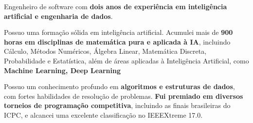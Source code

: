 \documentclass[a4paper,12pt]{article}
\begin{document}



Engenheiro de software com\textbf{ dois anos de experiência em inteligência artificial e engenharia de dados}.

Possuo uma formação sólida em inteligência artificial. Acumulei mais de \textbf{900 horas em disciplinas de matemática pura e aplicada à IA}, incluindo Cálculo, Métodos Numéricos, Álgebra Linear, Matemática Discreta, Probabilidade e Estatística, além de áreas aplicadas à Inteligência Artificial, como \textbf{Machine Learning, Deep Learning}

Possuo um conhecimento profundo em \textbf{algoritmos e estruturas de dados}, com fortes habilidades de resolução de problemas. \textbf{Fui premiado em diversos torneios de programação competitiva}, incluindo as finais brasileiras do ICPC, e alcancei uma excelente classificação no IEEEXtreme 17.0.
\end{document}

